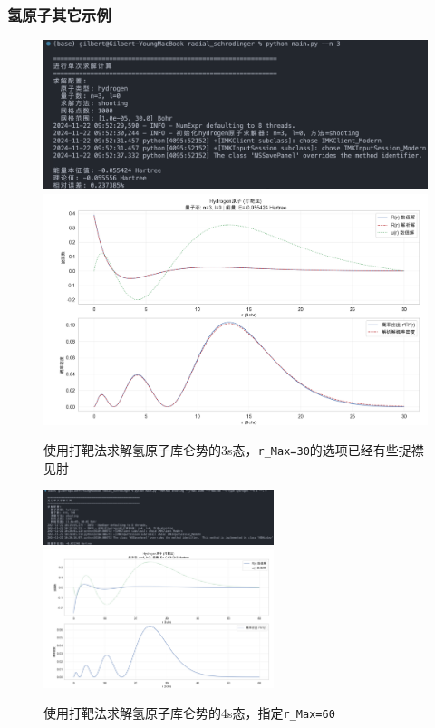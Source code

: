\subsubsection{氢原子其它示例}
\begin{figure}[H]
    \centering
    \includegraphics[width=1.0\textwidth]{Problem_2/figs/h_shooting_3s_terminal.png}
    \includegraphics[width=1.0\textwidth]{Problem_2/figs/h_shooting_3s.png}
    \caption{使用打靶法求解氢原子库仑势的3s态，\texttt{r\_Max=30}的选项已经有些捉襟见肘}
\end{figure}

\begin{figure}[H]
    \centering
    \includegraphics[width=0.6\textwidth]{Problem_2/figs/h_shooting_4s_terminal.png}
    \includegraphics[width=0.6\textwidth]{Problem_2/figs/h_shooting_4s.png}
    \caption{使用打靶法求解氢原子库仑势的4s态，指定\texttt{r\_Max=60}}
\end{figure}

